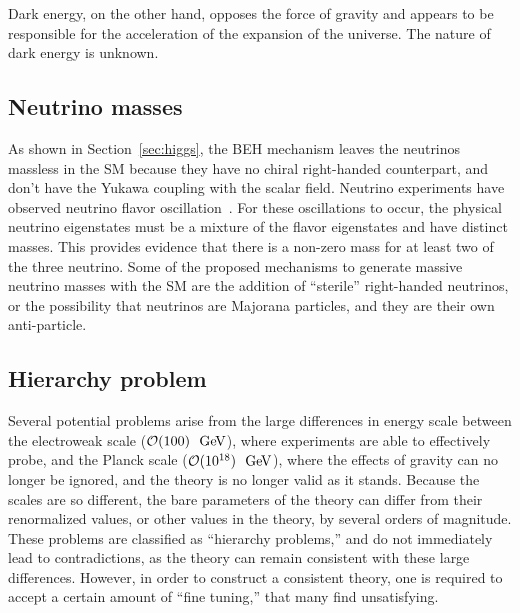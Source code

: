 Dark energy, on the other hand, opposes the force of gravity and appears to
be responsible for the acceleration of the expansion of the universe.
The nature of dark energy is unknown.

\FloatBarrier
\subsection{Neutrino masses}

As shown in Section~\ref{sec:higgs}, the BEH mechanism leaves the neutrinos
massless in the SM because they have no chiral right-handed counterpart, and
don't have the Yukawa coupling with the scalar field.
Neutrino experiments have observed neutrino flavor
oscillation~\cite{PhysRevD.86.010001}.
For these oscillations to occur, the physical neutrino eigenstates must be
a mixture of the flavor eigenstates and have distinct masses.
This provides evidence that there is a non-zero mass for at least two of the
three neutrino.
Some of the proposed mechanisms to generate massive neutrino masses with the
SM are the addition of ``sterile'' right-handed neutrinos, or the possibility
that neutrinos are Majorana particles, and they are their own anti-particle.

\FloatBarrier
\subsection{Hierarchy problem}

Several potential problems arise from the large differences in energy scale
between the electroweak scale ($\mathcal{O}(100)~\GeV$), where experiments are
able to effectively probe, and the Planck scale ($\mathcal{O}(10^{18})~\GeV$),
where the effects of gravity can no longer be ignored, and the theory is no
longer valid as it stands.
Because the scales are so different, the bare parameters of the theory can
differ from their renormalized values, or other values in the theory,
by several orders of magnitude.
These problems are classified as ``hierarchy problems,'' and do not immediately
lead to contradictions, as the theory can remain consistent with these large
differences.
However, in order to construct a consistent theory, one is required to accept
a certain amount of ``fine tuning,'' that many find unsatisfying.

